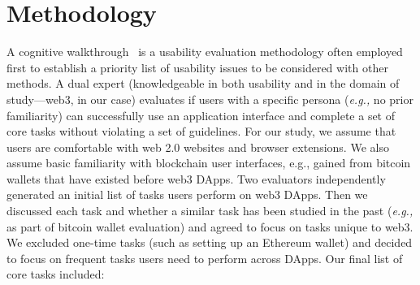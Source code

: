 \documentclass[conference]{IEEEtran}
\begin{document}






\section{Methodology}

A cognitive walkthrough~\cite{wharton1994cognitive} is a usability evaluation methodology often employed first to establish a priority list of usability issues to be considered with other methods. A dual expert (knowledgeable in both usability and in the domain of study---web3, in our case) evaluates if users with a specific persona (\textit{e.g.,} no prior familiarity) can successfully use an application interface and complete a set of core tasks without violating a set of guidelines.
For our study, we assume that users are comfortable with web 2.0 websites and browser extensions.
We also assume basic familiarity with blockchain user interfaces, e.g., gained from bitcoin wallets that have existed before web3 DApps.
Two evaluators independently generated an initial list of tasks users perform on web3 DApps. Then we discussed each task and whether a similar task has been studied in the past (\textit{e.g.,} as part of bitcoin wallet evaluation) and agreed to focus on tasks unique to web3.
We excluded one-time tasks (such as setting up an Ethereum wallet) and decided to focus on frequent tasks users need to perform across DApps.
Our final list of core tasks included:
\end{document}
